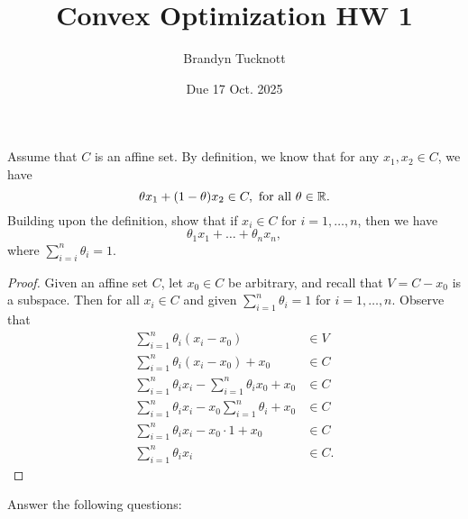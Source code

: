 \documentclass{exam}
\title{Convex Optimization HW 1}
\author{Brandyn Tucknott}
\date{Due 17 Oct. 2025}
\begin{document}
\maketitle

\begin{questions}
    \question Assume that $C$ is an affine set. By definition, we know that for any $x_1,x_2\in C$, we have
    $$\theta x_1 + (1 - \theta)x_2 \in C, \text{ for all } \theta\in\mathbb {R}.$$
    Building upon the definition, show that if $x_i\in C$ for $i = 1, \hdots, n$, then we have
    $$\theta_1 x_1 + \hdots + \theta_n x_n,$$
    where $\sum_{i = i}^n \theta_i = 1.$
    \begin{proof}
        Given an affine set $C$, let $x_0\in C$ be arbitrary, and recall that $V = C - x_0$ is a subspace. Then for all $x_i\in C$
        and given $\sum_{i = 1}^n \theta_i = 1$ for $i = 1, \hdots, n$. Observe that
        \begin{align*}
            \sum_{i = 1}^n \theta_i(x_i - x_0) &\in V \\
            \sum_{i = 1}^n \theta_i(x_i - x_0) + x_0&\in C \\
            \sum_{i = 1}^n \theta_ix_i - \sum_{i = 1}^n \theta_ix_0 + x_0 &\in C \\
            \sum_{i = 1}^n \theta_ix_i - x_0\sum_{i = 1}^n \theta_i + x_0 &\in C \\
            \sum_{i = 1}^n \theta_ix_i - x_0\cdot 1 + x_0 &\in C \\
            \sum_{i = 1}^n \theta_ix_i &\in C.
        \end{align*}
    \end{proof}


    \newpage
    \question Answer the following questions:



\end{questions}
\end{document}
